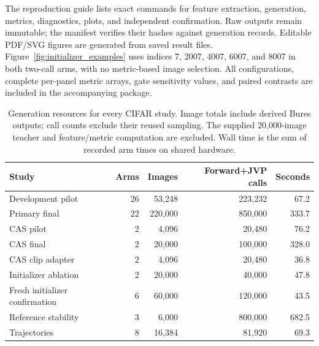 The reproduction guide lists exact commands for feature extraction, generation,
metrics, diagnostics, plots, and independent confirmation. Raw outputs remain
immutable; the manifest verifies their hashes against generation records.
Editable PDF/SVG figures are generated from saved result files.
Figure~\ref{fig:initializer_examples} uses indices 7, 2007, 4007, 6007,
and 8007 in both two-call arms, with no metric-based image selection. All configurations, complete
per-panel metric arrays, gate sensitivity values, and paired contrasts are
included in the accompanying package.

\begin{table}[t]
\centering
\small
\setlength{\tabcolsep}{3.5pt}
\caption{Generation resources for every CIFAR study. Image totals include derived Bures outputs; call counts exclude their reused sampling. The supplied 20,000-image teacher and feature/metric computation are excluded. Wall time is the sum of recorded arm times on shared hardware.}
\label{tab:cifar_resources}
\begin{tabular}{lrrrr}
\toprule
Study & Arms & Images & Forward+JVP calls & Seconds \\
\midrule
Development pilot & 26 & 53,248 & 223,232 & 67.2 \\
Primary final & 22 & 220,000 & 850,000 & 333.7 \\
CAS pilot & 2 & 4,096 & 20,480 & 76.2 \\
CAS final & 2 & 20,000 & 100,000 & 328.0 \\
CAS clip adapter & 2 & 4,096 & 20,480 & 36.8 \\
Initializer ablation & 2 & 20,000 & 40,000 & 47.8 \\
Fresh initializer confirmation & 6 & 60,000 & 120,000 & 43.5 \\
Reference stability & 3 & 6,000 & 800,000 & 682.5 \\
Trajectories & 8 & 16,384 & 81,920 & 69.3 \\
\bottomrule
\end{tabular}
\end{table}

